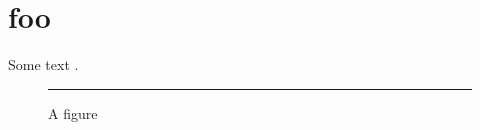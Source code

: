 \documentclass{article}
\begin{document}
	
	\listoffigures
	
	\section{foo}
	
	Some text \autocite{B02}.
	
	\begin{figure}[!h]
		\centering
		\rule{1cm}{1cm}
		\caption{A figure \autocite{A01}}
	\end{figure}
	
	\printbibliography
	
\end{document}
